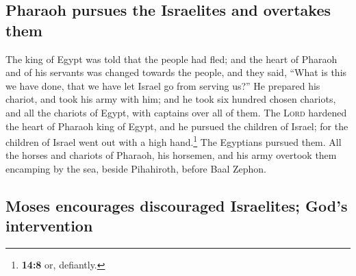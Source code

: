 \hypertarget{pharaoh-pursues-the-israelites-and-overtakes-them}{%
\subsection{Pharaoh pursues the Israelites and overtakes
them}\label{pharaoh-pursues-the-israelites-and-overtakes-them}}

 The king of Egypt was told that the people had fled; and
the heart of Pharaoh and of his servants was changed towards the people,
and they said, ``What is this we have done, that we have let Israel go
from serving us?''  He prepared his chariot, and took his
army with him;  and he took six hundred chosen chariots,
and all the chariots of Egypt, with captains over all of them.
 The \textsc{Lord} hardened the heart of Pharaoh king of
Egypt, and he pursued the children of Israel; for the children of Israel
went out with a high hand.\footnote{\textbf{14:8} or, defiantly.}
 The Egyptians pursued them. All the horses and chariots
of Pharaoh, his horsemen, and his army overtook them encamping by the
sea, beside Pihahiroth, before Baal Zephon.

\hypertarget{moses-encourages-discouraged-israelites-gods-intervention}{%
\subsection{Moses encourages discouraged Israelites; God's
intervention}\label{moses-encourages-discouraged-israelites-gods-intervention}}

